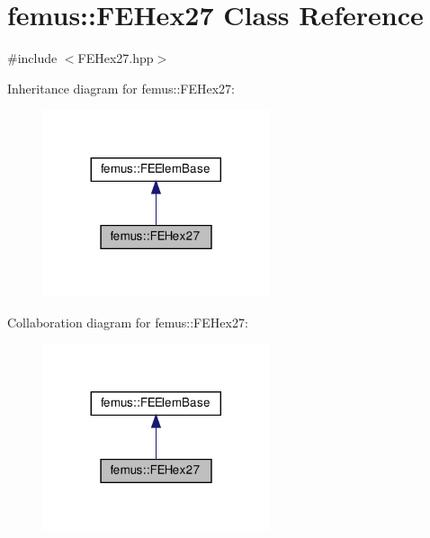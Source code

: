 \hypertarget{classfemus_1_1_f_e_hex27}{}\section{femus\+:\+:F\+E\+Hex27 Class Reference}
\label{classfemus_1_1_f_e_hex27}


{\ttfamily \#include $<$F\+E\+Hex27.\+hpp$>$}



Inheritance diagram for femus\+:\+:F\+E\+Hex27\+:
\nopagebreak
\begin{figure}[H]
\begin{center}
\leavevmode
\includegraphics[width=188pt]{classfemus_1_1_f_e_hex27__inherit__graph}
\end{center}
\end{figure}


Collaboration diagram for femus\+:\+:F\+E\+Hex27\+:
\nopagebreak
\begin{figure}[H]
\begin{center}
\leavevmode
\includegraphics[width=188pt]{classfemus_1_1_f_e_hex27__coll__graph}
\end{center}
\end{figure}
